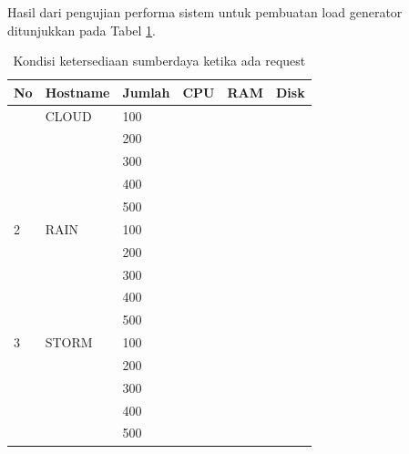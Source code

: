 				Hasil dari pengujian performa sistem untuk pembuatan load generator ditunjukkan pada Tabel \ref{sdhasilperforma}.
				\begin{longtable}{|p{}|p{}|p{}|p{}|p{}|p{}|}
					\caption{Kondisi ketersediaan sumberdaya ketika ada request} \label{sdhasilperforma} \\
					\hline
					\textbf{No} & \textbf{Hostname} & \textbf{Jumlah} & \textbf{CPU} & \textbf{RAM} & \textbf{Disk} \\ \hline
					\endhead
					\endfoot
					\endlastfoot
					1 & CLOUD & 100 & & & \\ \cline{3-6}
					&& 200 & & & \\ \cline{3-6}
					&& 300 & & & \\ \cline{3-6}
					&& 400 & & & \\ \cline{3-6}
					&& 500 & & & \\ \hline
					2 & RAIN & 100 & & & \\ \cline{3-6}
					&& 200 & & & \\ \cline{3-6}
					&& 300 & & & \\ \cline{3-6}
					&& 400 & & & \\ \cline{3-6}
					&& 500 & & & \\ \hline
					3 & STORM & 100 & & & \\ \cline{3-6}
					&& 200 & & & \\ \cline{3-6}
					&& 300 & & & \\ \cline{3-6}
					&& 400 & & & \\ \cline{3-6}
					&& 500 & & & \\ \hline
				\end{longtable}
			